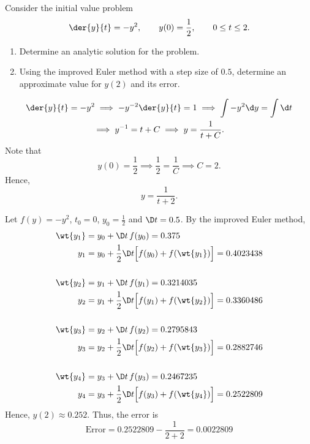 \begin{problem}
    Consider the initial value problem \[\der{y}{t} = -y^2, \qquad y(0) = \frac12, \qquad 0 \leq t \leq 2.\]
    \begin{enumerate}
        \item Determine an analytic solution for the problem.
        \item Using the improved Euler method with a step size of $0.5$, determine an approximate value for $y(2)$ and its error.
    \end{enumerate}
\end{problem}
\begin{solution}
    \begin{ppart}
        \begin{gather*}
            \der{y}{t} = -y^2 \implies -y^{-2} \der{y}{t} = 1  \implies \int -y^2 \d y = \int \d t\\
            \implies y^{-1} = t + C \implies y = \frac1{t + C}.
        \end{gather*}
        Note that \[y(0) = \frac12 \implies \frac12 = \frac1C \implies C = 2.\] Hence, \[y = \frac1{t + 2}.\]
    \end{ppart}
    \begin{ppart}
        Let $f(y) = -y^2$, $t_0 = 0$, $y_0 = \frac12$ and $\D t = 0.5$. By the improved Euler method,
        \begin{align*}
            \wt{y_1} &= y_0 + \D t \, f(y_0) = 0.375\\
            y_1 &= y_0 + \frac12 \D t \Big[f(y_0) + f(\wt{y_1})\Big] = 0.4023438\\\\
            \wt{y_2} &= y_1 + \D t \, f(y_1) = 0.3214035\\
            y_2 &= y_1 + \frac12 \D t \Big[f(y_1) + f(\wt{y_2})\Big] = 0.3360486\\\\
            \wt{y_3} &= y_2 + \D t \, f(y_2) = 0.2795843\\
            y_3 &= y_2 + \frac12 \D t \Big[f(y_2) + f(\wt{y_3})\Big] = 0.2882746\\\\
            \wt{y_4} &= y_3 + \D t \, f(y_3) = 0.2467235\\
            y_4 &= y_3 + \frac12 \D t \Big[f(y_3) + f(\wt{y_4})\Big] = 0.2522809
        \end{align*}
        Hence, $y(2) \approx 0.252$. Thus, the error is \[\text{Error} = 0.2522809 - \frac{1}{2+2} = 0.0022809\]
    \end{ppart}
\end{solution}

